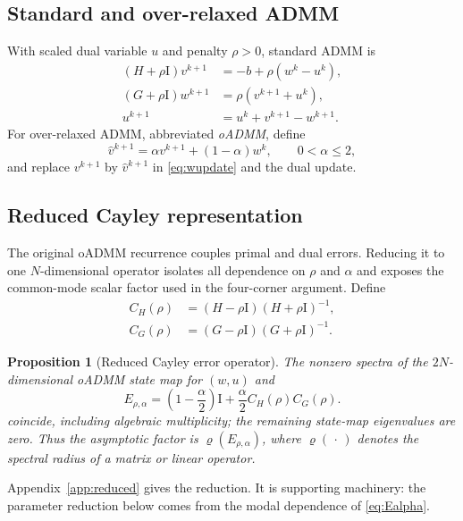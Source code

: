 \documentclass[pdflatex,iicol,sn-mathphys-num]{sn-jnl}
\newtheorem{proposition}[theorem]{Proposition}
\theoremstyle{definition}
\newcommand{\spr}{\varrho}
\newcommand{\Id}{\mathrm{I}}
\begin{document}
\subsection{Standard and over-relaxed ADMM}
With scaled dual variable $u$ and penalty $\rho>0$, standard ADMM is
\begin{align}
(H+\rho\Id)v^{k+1}&=-b+\rho(w^k-u^k),\label{eq:vupdate}\\
(G+\rho\Id)w^{k+1}&=\rho(v^{k+1}+u^k),\label{eq:wupdate}\\
u^{k+1}&=u^k+v^{k+1}-w^{k+1}.\label{eq:uupdate}
\end{align}
For over-relaxed ADMM, abbreviated \emph{oADMM}, define
\begin{equation}
\widehat v^{k+1}=\alpha v^{k+1}+(1-\alpha)w^k,
\qquad 0<\alpha\le2,
\label{eq:relaxation}
\end{equation}
and replace $v^{k+1}$ by $\widehat v^{k+1}$ in
\eqref{eq:wupdate} and the dual update.

\subsection{Reduced Cayley representation}
The original oADMM recurrence couples primal and dual errors. Reducing it to
one $N$-dimensional operator isolates all dependence on $\rho$ and $\alpha$ and
exposes the common-mode scalar factor used in the four-corner argument. Define
\begin{align}
C_H(\rho)&=(H-\rho\Id)(H+\rho\Id)^{-1},\nonumber\\
C_G(\rho)&=(G-\rho\Id)(G+\rho\Id)^{-1}.
\end{align}
\begin{proposition}[Reduced Cayley error operator]\label{prop:reduced}
The nonzero spectra of the $2N$-dimensional oADMM state map for $(w,u)$ and
\begin{equation}
E_{\rho,\alpha}
=\left(1-\frac{\alpha}{2}\right)\Id
+\frac{\alpha}{2}C_H(\rho)C_G(\rho).
\label{eq:Ealpha}
\end{equation}
coincide, including algebraic multiplicity; the remaining state-map
eigenvalues are zero. Thus the asymptotic factor is
$\spr(E_{\rho,\alpha})$, where $\spr(\,\cdot\,)$ denotes the spectral radius
of a matrix or linear operator.
\end{proposition}
Appendix~\ref{app:reduced} gives the reduction. It is supporting machinery:
the parameter reduction below comes from the modal dependence of
\eqref{eq:Ealpha}.
\end{document}
